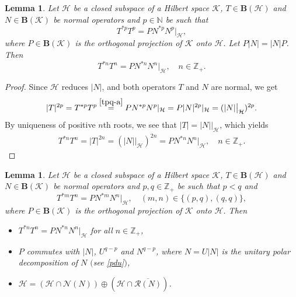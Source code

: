\documentclass[reqno]{amsproc}
\numberwithin{equation}{section}
\newtheorem{lemma}[theorem]{Lemma}
\theoremstyle{remark}
\newcommand*{\hh}{\mathcal{H}}
\newcommand*{\kk}{\mathcal{K}}
\newcommand*{\natu}{\mathbb{N}}
\newcommand*{\nul}{\mathscr{N}}
\newcommand*{\bou}{\boldsymbol{B}}
\theoremstyle{definition}
\newcommand*{\ran}{\mathscr{R}}
\newcommand*{\ogr}{\boldsymbol{B}}
\newcommand*{\zbb}{\mathbb{Z}}
\begin{document}
   \begin{lemma} \label{nwer}
Let $\hh$ be a closed subspace of a Hilbert
space $\kk$, $T\in \bou(\hh)$ and $N\in
\ogr(\kk)$ be normal operators and $p\in
\natu$ be such that
   \begin{equation} \label{tpq-a}
T^{*p}T^p=PN^{*p}N^p|_\hh,
   \end{equation}
where $P \in \ogr(\kk)$ is the orthogonal
projection of $\kk$ onto $\hh$. Let
$P|N|=|N|P$. Then
   \begin{equation*}
T^{*n}T^n=PN^{*n}N^n|_\hh,\quad n\in \zbb_+.
   \end{equation*}
   \end{lemma}
   \begin{proof}
Since $\hh$ reduces $|N|$, and both
operators $T$ and $N$ are normal, we get
   \begin{align*}
|T|^{2p} = T^{*p}T^p \overset{\eqref{tpq-a}}
= P N^{*p}N^p |_{\hh} = P|N|^{2p}|_{\hh} =
(|N|\big|_{\hh})^{2p}.
   \end{align*}
By uniqueness of positive $n$th roots, we see that
$|T|=|N|\big|_{\hh}$, which yields
   \begin{align*}  \tag*{\qedhere}
T^{*n}T^n = |T|^{2n} = (|N|\big|_{\hh})^{2n}
= PN^{*n}N^n|_{\hh}, \quad n \in \zbb_+.
   \end{align*}
   \end{proof}
   \begin{lemma} \label{wurnik}
Let $\hh$ be a closed subspace of a Hilbert
space $\kk$, $T\in \bou(\hh)$ and $N\in
\ogr(\kk)$ be normal operators and $p,q\in
\zbb_+$ be such that $p< q$ and
   \begin{equation} \label{tpq}
T^{*m}T^n=PN^{*m}N^n|_\hh, \quad (m,n) \in
\big\{(p,q),(q,q)\big\},
   \end{equation}
where $P \in \ogr(\kk)$ is the orthogonal
projection of $\kk$ onto $\hh$. Then
   \begin{itemize}
   \item[(i)] $T^{*n}T^n=PN^{*n}N^n|_\hh$ for
all $n\in \zbb_+$,
   \item[(ii)] $P$ commutes with $|N|$, $U^{q-p}$
and $N^{q-p}$, where $N=U |N|$ is the
unitary polar decomposition of $N$ $($see
\eqref{pdu}$)$,
  \item[(iii)] $\hh=(\hh\cap\nul(N))
\oplus(\hh\cap\overline{\ran(N)})$.
   \end{itemize}
   \end{lemma}
\end{document}

